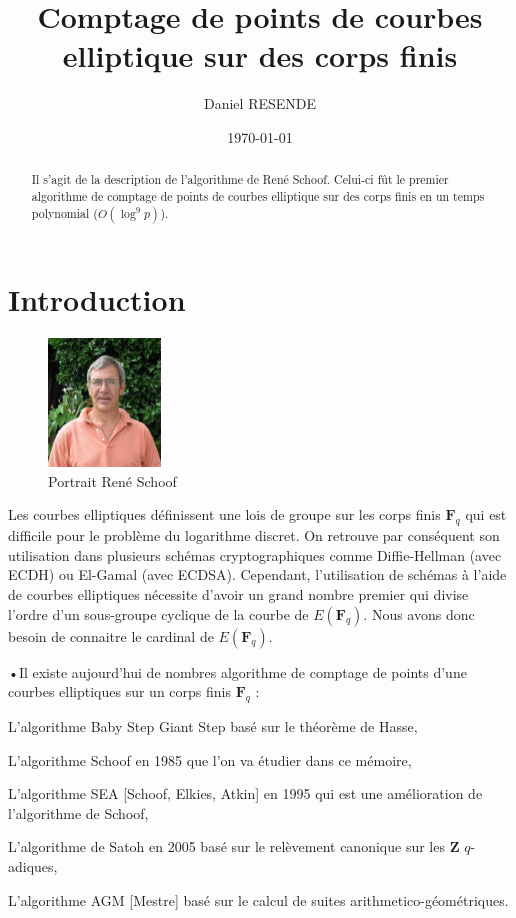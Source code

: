 \documentclass{article}%
\title{Comptage de points de courbes elliptique sur des corps finis}
\author{Daniel RESENDE}
\date{\today}
\theoremstyle{plain}
\theoremstyle{definition}
\theoremstyle{plain}
\theoremstyle{remark}
\newcommand\fq{\mathbf{F}_{q}}
\begin{document}
\maketitle

\begin{abstract}
Il s'agit de la description de l'algorithme de René Schoof. Celui-ci fût le premier algorithme de comptage de points de courbes elliptique sur des corps finis en un temps polynomial ($O(\log^{9} p)$).  
\end{abstract}

\tableofcontents

\clearpage{}
\section*{Introduction}

\begin{figure}
\includegraphics[width=3cm]{Rene_Schoof.jpg}
\caption{\label{étiquette}Portrait René Schoof}
\end{figure}
Les courbes elliptiques définissent une lois de groupe sur les corps finis $\fq$ qui est difficile pour le problème du logarithme discret. On retrouve par conséquent son utilisation dans plusieurs schémas cryptographiques comme Diffie-Hellman (avec ECDH) ou El-Gamal (avec ECDSA).
Cependant, l'utilisation de schémas à l'aide de courbes elliptiques nécessite d'avoir un grand nombre premier qui divise l'ordre d'un sous-groupe cyclique de la courbe de $E(\fq)$. Nous avons donc besoin de connaitre le cardinal de $E(\fq)$.

\begin{list}{•}{Il existe aujourd'hui de nombres algorithme de comptage de points d'une courbes elliptiques sur un corps finis $\fq$ :}
\item L'algorithme Baby Step Giant Step basé sur le théorème de Hasse,
\item L'algorithme Schoof en 1985 que l'on va étudier dans ce mémoire,
\item L'algorithme SEA [Schoof, Elkies, Atkin] en 1995 qui est une amélioration de l'algorithme de Schoof,
\item L'algorithme de Satoh en 2005 basé sur le relèvement canonique sur les $\mathbf{Z}$ $q$-adiques,
\item L'algorithme AGM [Mestre] basé sur le calcul de suites arithmetico-géométriques.
\end{list}
\end{document}
